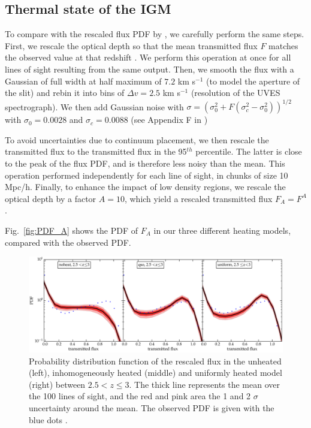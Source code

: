 \documentclass[numberedappendix]{emulateapj}
\begin{document}
\subsection{Thermal state of the IGM}
To compare with the rescaled flux PDF by \citet{2017MNRAS.466.2690R}, we carefully perform the same steps. First, we rescale the optical depth so that the mean transmitted flux $F$ matches the observed value at that redshift \citep{2013MNRAS.436.1023B}. We perform this operation at once for all lines of sight resulting from the same output.  Then, we smooth the flux with a Gaussian of full width at half maximum of $7.2$ km s$^{-1}$ (to model the aperture of the slit) and rebin it into bins of $\Delta v=2.5$ km s$^{-1}$ (resolution of the UVES spectrograph). We then add Gaussian noise with $\sigma=(\sigma_0^2+F(\sigma_c^2-\sigma_0^2))^{1/2}$ with $\sigma_0=0.0028$ and $\sigma_c=0.0088$ (see Appendix F in \citet{2017MNRAS.466.2690R})

To avoid uncertainties due to continuum placement, we then rescale the transmitted flux to the transmitted flux in the 95$^{th}$ percentile. The latter is close to the peak of the flux PDF, and is therefore less noisy than the mean. This operation performed independently for each line of sight, in chunks of size 10 Mpc/h. Finally, to enhance the impact of low density regions, we rescale the optical depth by a factor $A=10$, which yield a rescaled transmitted flux $F_A=F^A$.


Fig.~\ref{fig:PDF_A} shows the PDF of $F_A$ in our three different heating models, compared with the observed PDF. 




\begin{figure}[h]
\centering
\includegraphics[width = .9\textwidth ]{PDF_allz_100lines}
\caption{Probability distribution function of the rescaled flux in the unheated (left), inhomogeneously heated (middle) and uniformly heated model (right) between $2.5 <z\leq 3$. The thick line represents the mean over the 100 lines of sight, and the red and pink area the 1 and 2 $\sigma$ uncertainty around the mean. The observed PDF is given with the blue dots \citet{2017MNRAS.466.2690R}. }
\label{fig:fluxPDF}
\end{figure}
\end{document}
